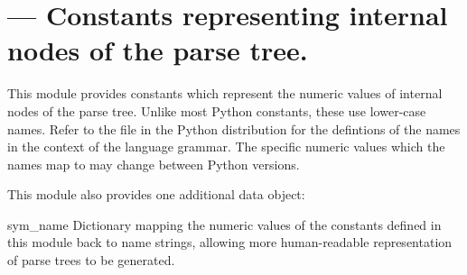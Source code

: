 \section{ ---
         Constants representing internal nodes of the parse tree.}



This module provides constants which represent the numeric values of
internal nodes of the parse tree.  Unlike most Python constants, these
use lower-case names.  Refer to the file  in the
Python distribution for the defintions of the names in the context of
the language grammar.  The specific numeric values which the names map
to may change between Python versions.

This module also provides one additional data object:



\begin{datadesc}{sym_name}
Dictionary mapping the numeric values of the constants defined in this
module back to name strings, allowing more human-readable
representation of parse trees to be generated.
\end{datadesc}

\begin{seealso}
\end{seealso}

